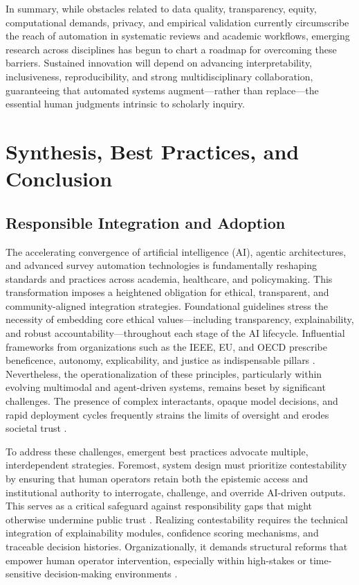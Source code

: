 \documentclass[sigconf]{acmart}
\begin{document}
In summary, while obstacles related to data quality, transparency, equity, computational demands, privacy, and empirical validation currently circumscribe the reach of automation in systematic reviews and academic workflows, emerging research across disciplines has begun to chart a roadmap for overcoming these barriers. Sustained innovation will depend on advancing interpretability, inclusiveness, reproducibility, and strong multidisciplinary collaboration, guaranteeing that automated systems augment—rather than replace—the essential human judgments intrinsic to scholarly inquiry.

\section{Synthesis, Best Practices, and Conclusion}

\subsection{Responsible Integration and Adoption}

The accelerating convergence of artificial intelligence (AI), agentic architectures, and advanced survey automation technologies is fundamentally reshaping standards and practices across academia, healthcare, and policymaking. This transformation imposes a heightened obligation for ethical, transparent, and community-aligned integration strategies. Foundational guidelines stress the necessity of embedding core ethical values—including transparency, explainability, and robust accountability—throughout each stage of the AI lifecycle. Influential frameworks from organizations such as the IEEE, EU, and OECD prescribe beneficence, autonomy, explicability, and justice as indispensable pillars \cite{ref95,ref96,ref100,ref106,ref109,ref110}. Nevertheless, the operationalization of these principles, particularly within evolving multimodal and agent-driven systems, remains beset by significant challenges. The presence of complex interactants, opaque model decisions, and rapid deployment cycles frequently strains the limits of oversight and erodes societal trust \cite{ref98,ref100,ref106}.

To address these challenges, emergent best practices advocate multiple, interdependent strategies. Foremost, system design must prioritize contestability by ensuring that human operators retain both the epistemic access and institutional authority to interrogate, challenge, and override AI-driven outputs. This serves as a critical safeguard against responsibility gaps that might otherwise undermine public trust \cite{ref97,ref98,ref100}. Realizing contestability requires the technical integration of explainability modules, confidence scoring mechanisms, and traceable decision histories. Organizationally, it demands structural reforms that empower human operator intervention, especially within high-stakes or time-sensitive decision-making environments \cite{ref96,ref97,ref100,ref106}.
\end{document}

